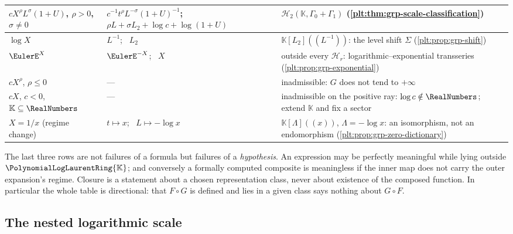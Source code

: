 \documentclass[11pt,oneside]{article}
\theoremstyle{plain}
\theoremstyle{definition}
\theoremstyle{remark}
\newcommand{\K}{\mathbb{K}}
\newcommand{\PLlau}{\PolynomialLogLaurentRing{\K}}       %
\newcommand{\compose}{\mathbin{\circ}}
\begin{document}
\begin{table}[htbp]
\begin{tabular}{|p{}|p{}|p{}|}
\hline
\(cX^{\rho}L^{\sigma}(1+U)\), \(\rho>0\), \(\sigma\ne0\) &
\(c^{-1}t^{\rho}L^{-\sigma}(1+U)^{-1}\); \
\(\rho L+\sigma L_2+\log c+\log(1+U)\) &
\(\mathcal H_2(\K,\Gamma_0+\Gamma_1)\)
(\cref{plt:thm:grp-scale-classification})\\
\hline
\(\log X\) &
\(L^{-1}\); \ \(L_2\) &
\(\K[L_2]((L^{-1}))\): the level shift \(\Sigma\)
(\cref{plt:prop:grp-shift})\\
\hline
\(\EulerE^{X}\) &
\(\EulerE^{-X}\); \ \(X\) &
outside every \(\mathcal H_r\): logarithmic--exponential transseries
(\cref{plt:prop:grp-exponential})\\
\hline
\(cX^{\rho}\), \(\rho\le0\) &
--- &
inadmissible: \(G\) does not tend to \(+\infty\)\\
\hline
\(cX\), \(c<0\), \(\K\subseteq\RealNumbers\) &
--- &
inadmissible on the positive ray: \(\log c\notin\RealNumbers\); extend \(\K\)
and fix a sector\\
\hline
\(X=1/x\) (regime change) &
\(t\mapsto x\); \ \(L\mapsto-\log x\) &
\(\K[\Lambda]((x))\), \(\Lambda=-\log x\): an isomorphism, not an
endomorphism (\cref{plt:prop:grp-zero-dictionary})\\
\hline
\end{tabular}
\end{table}

\begin{warningbox}
The last three rows are not failures of a formula but failures of a
\emph{hypothesis}.  An expression may be perfectly meaningful while lying
outside \(\PLlau\); and conversely a formally computed composite is
meaningless if the inner map does not carry the outer expansion's regime.
Closure is a statement about a chosen representation class, never about
existence of the composed function.  In particular the whole table is
directional: that \(F\compose G\) is defined and lies in a given class says
nothing about \(G\compose F\).
\end{warningbox}

\subsection{The nested logarithmic scale}
\end{document}
